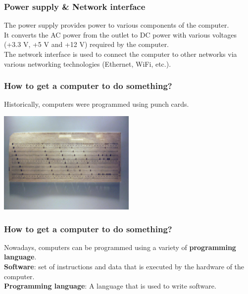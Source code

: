 \documentclass{beamer}
\begin{document}
\begin{frame}
  \frametitle{Power supply \& Network interface}
  The power supply provides power to various components of the computer.\\
  \vspace{5mm}
  It converts the AC power from the outlet to DC power with various voltages (+3.3 V, +5 V and +12 V) required by the computer.\\
  \vspace{5mm}
  The network interface is used to connect the computer to other networks via various networking technologies (Ethernet, WiFi, etc.).\\
\end{frame}
\begin{frame}
  \frametitle{How to get a computer to do something?}
  Historically, computers were programmed using punch cards.\\
  \begin{center}
    \includegraphics[width=0.5\textwidth]{fig/punchcard.jpg}
  \end{center}
\end{frame}
\begin{frame}
  \frametitle{How to get a computer to do something?}
  Nowadays, computers can be programmed using a variety of \textbf{programming language}.\\
  \vspace{5mm}
  \textbf{Software}: set of instructions and data that is executed by the hardware of the computer.\\
  \vspace{5mm}
  \textbf{Programming language}: A language that is used to write software.\\
\end{frame}
\end{document}
